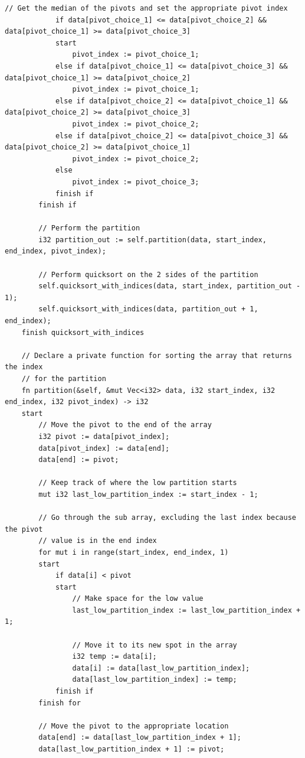 \documentclass[letterpaper, 10pt, DIV=13]{scrartcl}
\numberwithin{equation}{section}
\numberwithin{figure}{section}
\numberwithin{table}{section}
\begin{document}
\begin{lstlisting}[caption = SortsAndShuffles.rez, frame = single, nolol]
            // Get the median of the pivots and set the appropriate pivot index
            if data[pivot_choice_1] <= data[pivot_choice_2] && data[pivot_choice_1] >= data[pivot_choice_3]
            start
                pivot_index := pivot_choice_1;
            else if data[pivot_choice_1] <= data[pivot_choice_3] && data[pivot_choice_1] >= data[pivot_choice_2]
                pivot_index := pivot_choice_1;
            else if data[pivot_choice_2] <= data[pivot_choice_1] && data[pivot_choice_2] >= data[pivot_choice_3]
                pivot_index := pivot_choice_2;
            else if data[pivot_choice_2] <= data[pivot_choice_3] && data[pivot_choice_2] >= data[pivot_choice_1]
                pivot_index := pivot_choice_2;
            else
                pivot_index := pivot_choice_3;
            finish if
        finish if
        
        // Perform the partition
        i32 partition_out := self.partition(data, start_index, end_index, pivot_index);

        // Perform quicksort on the 2 sides of the partition
        self.quicksort_with_indices(data, start_index, partition_out - 1);
        self.quicksort_with_indices(data, partition_out + 1, end_index);
    finish quicksort_with_indices

    // Declare a private function for sorting the array that returns the index
    // for the partition
    fn partition(&self, &mut Vec<i32> data, i32 start_index, i32 end_index, i32 pivot_index) -> i32
    start
        // Move the pivot to the end of the array
        i32 pivot := data[pivot_index];
        data[pivot_index] := data[end];
        data[end] := pivot;

        // Keep track of where the low partition starts
        mut i32 last_low_partition_index := start_index - 1;

        // Go through the sub array, excluding the last index because the pivot
        // value is in the end index
        for mut i in range(start_index, end_index, 1)
        start
            if data[i] < pivot
            start
                // Make space for the low value
                last_low_partition_index := last_low_partition_index + 1;

                // Move it to its new spot in the array
                i32 temp := data[i];
                data[i] := data[last_low_partition_index];
                data[last_low_partition_index] := temp;
            finish if
        finish for

        // Move the pivot to the appropriate location
        data[end] := data[last_low_partition_index + 1];
        data[last_low_partition_index + 1] := pivot;


\end{lstlisting}
\end{document}
